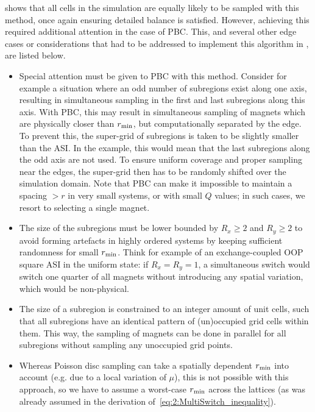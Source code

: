  shows that all cells in the simulation are equally likely to be sampled with this method, once again ensuring detailed balance is satisfied.
However, achieving this required additional attention in the case of PBC.
This, and several other edge cases or considerations that had to be addressed to implement this algorithm in \hotspice, are listed below.
\begin{itemize}
	\item Special attention must be given to PBC with this method.
	Consider for example a situation where an odd number of subregions exist along one axis, resulting in simultaneous sampling in the first and last subregions along this axis.
	With PBC, this may result in simultaneous sampling of magnets which are physically closer than $r_\mathrm{min}$, but computationally separated by the edge.
	To prevent this, the super-grid of subregions is taken to be slightly smaller than the ASI.
	In the example, this would mean that the last subregions along the odd axis are not used.
	To ensure uniform coverage and proper sampling near the edges, the super-grid then has to be randomly shifted over the simulation domain.
	Note that PBC can make it impossible to maintain a spacing $>r$ in very small systems, or with small $Q$ values; in such cases, we resort to selecting a single magnet.
	\item The size of the subregions must be lower bounded by $R_x \geq 2$ and $R_y \geq 2$ to avoid forming artefacts in highly ordered systems by keeping sufficient randomness for small $r_\mathrm{min}$.
	Think for example of an exchange-coupled OOP square ASI in the uniform state: if $R_x = R_y = 1$, a simultaneous switch would switch one quarter of all magnets without introducing any spatial variation, which would be non-physical.
	\item The size of a subregion is constrained to an integer amount of unit cells, such that all subregions have an identical pattern of (un)occupied grid cells within them.
	This way, the sampling of magnets can be done in parallel for all subregions without sampling any unoccupied grid points.
	\item Whereas Poisson disc sampling can take a spatially dependent $r_\mathrm{min}$ into account (e.g. due to a local variation of $\mu$), this is not possible with this approach, so we have to assume a worst-case $r_\mathrm{min}$ across the lattices (as was already assumed in the derivation of~\cref{eq:2:MultiSwitch_inequality}).
\end{itemize}

